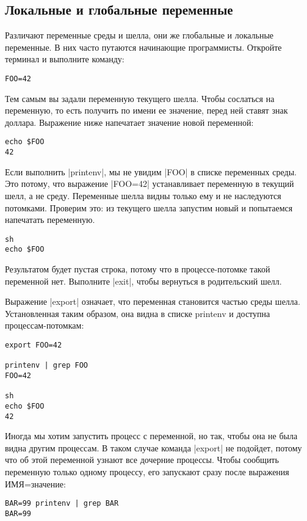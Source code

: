 \subsection{Локальные и глобальные переменные}

Различают переменные среды и шелла, они же глобальные и локальные переменные. В
них часто путаются начинающие программисты. Откройте терминал и выполните
команду:

\begin{verbatim}
FOO=42
\end{verbatim}

Тем самым вы задали переменную текущего шелла. Чтобы сослаться на переменную, то
есть получить по имени ее значение, перед ней ставят знак доллара. Выражение
ниже напечатает значение новой переменной:

\begin{verbatim}
echo $FOO
42
\end{verbatim}

Если выполнить \spverb|printenv|, мы не увидим \spverb|FOO| в списке переменных среды. Это
потому, что выражение \spverb|FOO=42| устанавливает переменную в текущий шелл, а не
среду. Переменные шелла видны только ему и не наследуются потомками. Проверим
это: из текущего шелла запустим новый и попытаемся напечатать переменную.

\begin{verbatim}
sh
echo $FOO
\end{verbatim}

Результатом будет пустая строка, потому что в процессе-потомке такой переменной
нет. Выполните \spverb|exit|, чтобы вернуться в родительский шелл.

Выражение \spverb|export| означает, что переменная становится частью среды
шелла. Установленная таким образом, она видна в списке printenv и доступна
процессам-потомкам:

\begin{verbatim}
export FOO=42

printenv | grep FOO
FOO=42

sh
echo $FOO
42
\end{verbatim}

Иногда мы хотим запустить процесс с переменной, но так, чтобы она не была видна
другим процессам. В таком случае команда \spverb|export| не подойдет, потому что об
этой переменной узнают все дочерние процессы. Чтобы сообщить переменную только
одному процессу, его запускают сразу после выражения ИМЯ=значение:

\begin{verbatim}
BAR=99 printenv | grep BAR
BAR=99
\end{verbatim}

